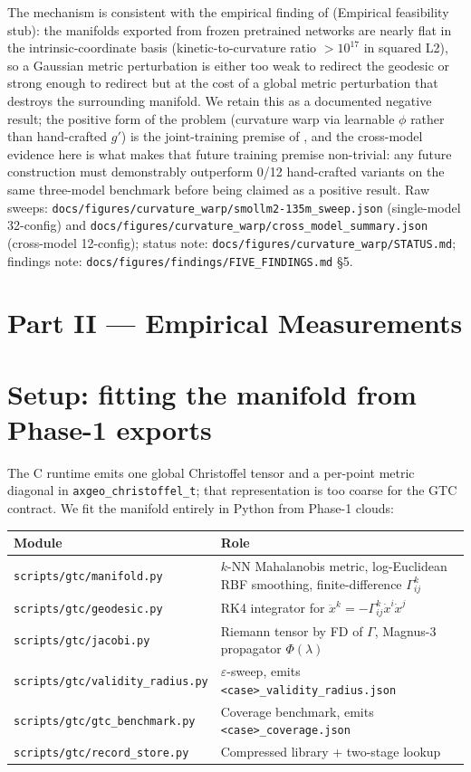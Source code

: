 \documentclass[11pt]{article}
\begin{document}
The mechanism is consistent with the empirical finding of
 (Empirical feasibility stub): the manifolds
exported from frozen pretrained networks are nearly flat in the
intrinsic-coordinate basis (kinetic-to-curvature ratio $> 10^{17}$
in squared L2), so a Gaussian metric perturbation is either too weak
to redirect the geodesic or strong enough to redirect but at the cost
of a global metric perturbation that destroys the surrounding
manifold. We retain this as a documented negative result; the positive
form of the problem (curvature warp via learnable $\phi$ rather
than hand-crafted $g'$) is the joint-training premise of
, and the cross-model evidence here is what
makes that future training premise non-trivial: any future
construction must demonstrably outperform 0/12 hand-crafted variants
on the same three-model benchmark before being claimed as a positive
result. Raw sweeps:
\texttt{docs/figures/curvature\_warp/smollm2-135m\_sweep.json}
(single-model 32-config) and
\texttt{docs/figures/curvature\_warp/cross\_model\_summary.json}
(cross-model 12-config); status note:
\texttt{docs/figures/curvature\_warp/STATUS.md};
findings note:
\texttt{docs/figures/findings/FIVE\_FINDINGS.md} \S5.

\section*{Part II — Empirical Measurements}

\section{Setup: fitting the manifold from Phase-1 exports}
\label{sec:setup}

The C runtime emits one global Christoffel tensor and a per-point metric
diagonal in \texttt{axgeo\_christoffel\_t}; that representation is too coarse
for the GTC contract. We fit the manifold entirely in Python from Phase-1
clouds:

\begin{center}\small
\begin{tabularx}{\linewidth}{lX}
\toprule
Module & Role\\
\midrule
\texttt{scripts/gtc/manifold.py}      & $k$-NN Mahalanobis metric, log-Euclidean RBF smoothing, finite-difference $\Gamma^k_{ij}$\\
\texttt{scripts/gtc/geodesic.py}      & RK4 integrator for $\ddot x^k = -\Gamma^k_{ij}\dot x^i \dot x^j$\\
\texttt{scripts/gtc/jacobi.py}        & Riemann tensor by FD of $\Gamma$, Magnus-3 propagator $\Phi(\lambda)$\\
\texttt{scripts/gtc/validity\_radius.py} & $\varepsilon$-sweep, emits \texttt{<case>\_validity\_radius.json}\\
\texttt{scripts/gtc/gtc\_benchmark.py} & Coverage benchmark, emits \texttt{<case>\_coverage.json}\\
\texttt{scripts/gtc/record\_store.py} & Compressed library + two-stage lookup\\
\bottomrule
\end{tabularx}
\end{center}
\end{document}
